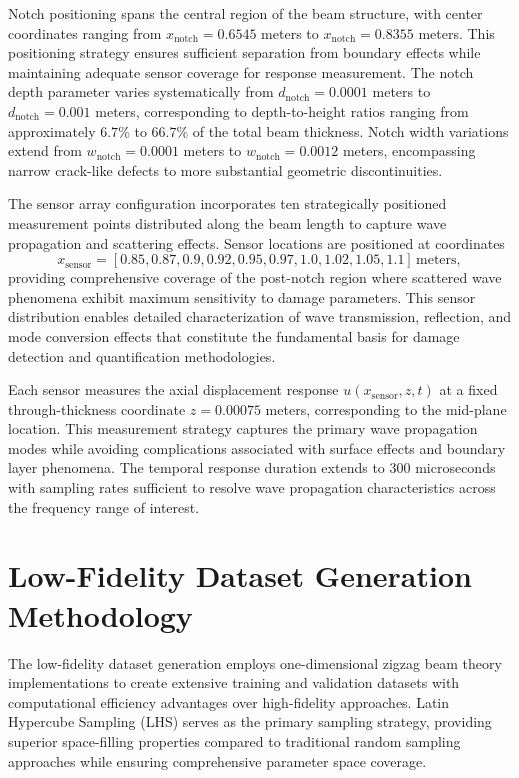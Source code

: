 \documentclass[12pt,a4paper]{report}
\begin{document}
Notch positioning spans the central region of the beam structure, with center coordinates ranging from $x_{\text{notch}} = 0.6545$ meters to $x_{\text{notch}} = 0.8355$ meters. This positioning strategy ensures sufficient separation from boundary effects while maintaining adequate sensor coverage for response measurement. The notch depth parameter varies systematically from $d_{\text{notch}} = 0.0001$ meters to $d_{\text{notch}} = 0.001$ meters, corresponding to depth-to-height ratios ranging from approximately $6.7\%$ to $66.7\%$ of the total beam thickness. Notch width variations extend from $w_{\text{notch}} = 0.0001$ meters to $w_{\text{notch}} = 0.0012$ meters, encompassing narrow crack-like defects to more substantial geometric discontinuities.

The sensor array configuration incorporates ten strategically positioned measurement points distributed along the beam length to capture wave propagation and scattering effects. Sensor locations are positioned at coordinates
\[
x_{\text{sensor}} = [0.85, 0.87, 0.9, 0.92, 0.95, 0.97, 1.0, 1.02, 1.05, 1.1] \, \text{meters},
\]
providing comprehensive coverage of the post-notch region where scattered wave phenomena exhibit maximum sensitivity to damage parameters. This sensor distribution enables detailed characterization of wave transmission, reflection, and mode conversion effects that constitute the fundamental basis for damage detection and quantification methodologies.

Each sensor measures the axial displacement response $u(x_{\text{sensor}}, z, t)$ at a fixed through-thickness coordinate $z = 0.00075$ meters, corresponding to the mid-plane location. This measurement strategy captures the primary wave propagation modes while avoiding complications associated with surface effects and boundary layer phenomena. The temporal response duration extends to $300$ microseconds with sampling rates sufficient to resolve wave propagation characteristics across the frequency range of interest.

\section{Low-Fidelity Dataset Generation Methodology}

The low-fidelity dataset generation employs one-dimensional zigzag beam theory implementations to create extensive training and validation datasets with computational efficiency advantages over high-fidelity approaches. Latin Hypercube Sampling (LHS) serves as the primary sampling strategy, providing superior space-filling properties compared to traditional random sampling approaches while ensuring comprehensive parameter space coverage.
\end{document}
